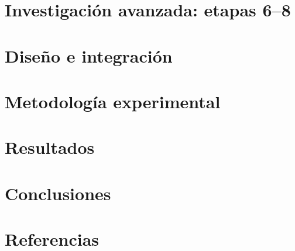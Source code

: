 \documentclass[10pt,a4paper]{article}
\begin{document}
\section{Investigación avanzada: etapas 6–8}\label{sec:inv}


\section{Diseño e integración}\label{sec:diseno}


\section{Metodología experimental}\label{sec:metodo}


\section{Resultados}\label{sec:res}


\section{Conclusiones}


\small
\section*{Referencias}
{\sloppy}
\end{document}

